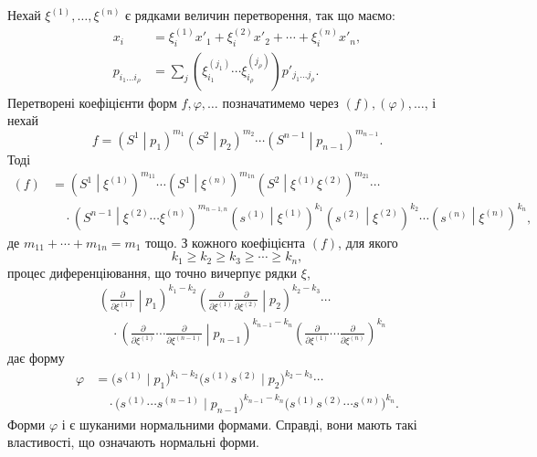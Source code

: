 \documentclass[11pt]{article}
\newcommand{\pair}[2]{\left(#1\middle|#2\right)}
\begin{document}
Нехай $\xi^{(1)},\ldots,\xi^{(n)}$ є рядками величин перетворення, так що маємо:
\begin{equation}
\begin{aligned}
x_i&=\xi_i^{(1)}x'_1+\xi_i^{(2)}x'_2+\cdots+\xi_i^{(n)}x'_n,\\
p_{i_1\ldots i_\rho}&=\sum_j(\xi_{i_1}^{(j_1)}\cdots \xi_{i_\rho}^{(j_\rho)})p'_{j_1\ldots j_\rho}.
\end{aligned}
\tag{47}
\end{equation}
Перетворені коефіцієнти форм $f,\varphi,\ldots$ позначатимемо через $(f),(\varphi),\ldots$, і нехай
\[
 f=\pair{S^1}{p_1}^{m_1}\pair{S^2}{p_2}^{m_2}\cdots\pair{S^{n-1}}{p_{n-1}}^{m_{n-1}}.
\]
Тоді
\begin{equation}
\begin{aligned}
(f)&=\pair{S^1}{\xi^{(1)}}^{m_{11}}\cdots
\pair{S^1}{\xi^{(n)}}^{m_{1n}}
\pair{S^2}{\xi^{(1)}\xi^{(2)}}^{m_{21}}\cdots\\
&\quad\cdot
\pair{S^{n-1}}{\xi^{(2)}\cdots\xi^{(n)}}^{m_{n-1,n}}
\pair{s^{(1)}}{\xi^{(1)}}^{k_1}
\pair{s^{(2)}}{\xi^{(2)}}^{k_2}\cdots
\pair{s^{(n)}}{\xi^{(n)}}^{k_n},
\end{aligned}
\tag{48}
\end{equation}
де $m_{11}+\cdots+m_{1n}=m_1$ тощо. З кожного коефіцієнта $(f)$, для якого
\begin{equation}
 k_1\ge k_2\ge k_3\ge\cdots\ge k_n,
\tag{49}
\end{equation}
процес диференціювання, що точно вичерпує рядки $\xi$,
\begin{equation}
\begin{aligned}
&\left(\frac{\partial}{\partial\xi^{(1)}}\middle|p_1\right)^{k_1-k_2}
\left(\frac{\partial}{\partial\xi^{(1)}}\frac{\partial}{\partial\xi^{(2)}}\middle|p_2\right)^{k_2-k_3}\cdots\\
&\quad\cdot
\left(\frac{\partial}{\partial\xi^{(1)}}\cdots\frac{\partial}{\partial\xi^{(n-1)}}\middle|p_{n-1}\right)^{k_{n-1}-k_n}
\left(\frac{\partial}{\partial\xi^{(1)}}\cdots\frac{\partial}{\partial\xi^{(n)}}\right)^{k_n}
\end{aligned}
\tag{50}
\end{equation}
дає форму
\begin{equation}
\begin{aligned}
 \varphi&=\bigl(s^{(1)}\mid p_1\bigr)^{k_1-k_2}
 \bigl(s^{(1)}s^{(2)}\mid p_2\bigr)^{k_2-k_3}\cdots\\
 &\quad\cdot
 \bigl(s^{(1)}\cdots s^{(n-1)}\mid p_{n-1}\bigr)^{k_{n-1}-k_n}
 \bigl(s^{(1)}s^{(2)}\cdots s^{(n)}\bigr)^{k_n}.
\end{aligned}
\tag{51}
\end{equation}
Форми $\varphi$ і є шуканими нормальними формами. Справді, вони мають такі властивості, що означають нормальні форми.
\end{document}
